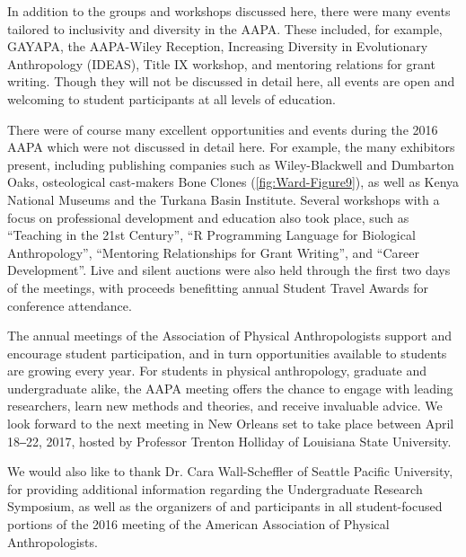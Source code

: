 \documentclass[english]{ijsra}
\begin{document}
In addition to the groups and workshops discussed here, there were many events tailored to inclusivity and diversity in the AAPA.
These included, for example, GAYAPA, the AAPA-Wiley Reception, Increasing Diversity in Evolutionary Anthropology (IDEAS),
Title IX workshop, and mentoring relations for grant writing.  
Though they will not be discussed in detail here, all events are open and welcoming to student participants at all levels of education.

There  were of course many excellent opportunities and events during the 2016 AAPA which were not discussed in detail here.
For example, the many exhibitors present, including publishing companies such as Wiley-Blackwell and Dumbarton Oaks,
osteological cast-makers Bone Clones (\cref{fig:Ward-Figure9}), as well as Kenya National Museums and the Turkana Basin Institute. 
Several workshops with a focus on professional development and education also took place, such as “Teaching in the 21st Century”,
“R Programming Language for Biological Anthropology”, “Mentoring Relationships for Grant Writing”, and  “Career Development”.
Live and silent auctions were also held through the first two days of the meetings, 
with proceeds benefitting annual Student Travel Awards for conference attendance.


The annual meetings of the Association of Physical Anthropologists support and encourage student participation,
and in turn opportunities available to students are growing every year. For students in physical anthropology, 
graduate and undergraduate alike, the AAPA meeting offers the chance to engage with leading researchers,
learn new methods and theories, and receive invaluable advice. 
We look forward to the next meeting in New Orleans set to take place between April 18‒22, 2017, 
hosted by Professor Trenton Holliday of Louisiana State University.

We  would also like to thank Dr. Cara Wall-Scheffler of Seattle Pacific University,  
for providing additional information regarding the Undergraduate Research Symposium,
as well as the organizers of and participants in all student-focused portions of the 2016 meeting of
the American Association of Physical Anthropologists.
\IJSRAclosing%
\end{document}
